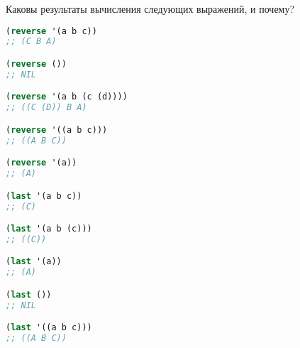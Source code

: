 Каковы результаты вычисления следующих выражений, и почему?

\begin{lstlisting}[language=Lisp]
(reverse '(a b c))
;; (C B A)

(reverse ())
;; NIL

(reverse '(a b (c (d))))
;; ((C (D)) B A)

(reverse '((a b c)))
;; ((A B C))

(reverse '(a))
;; (A)

(last '(a b c))
;; (C)

(last '(a b (c)))
;; ((C))

(last '(a))
;; (A)

(last ())
;; NIL

(last '((a b c)))
;; ((A B C))
\end{lstlisting}


